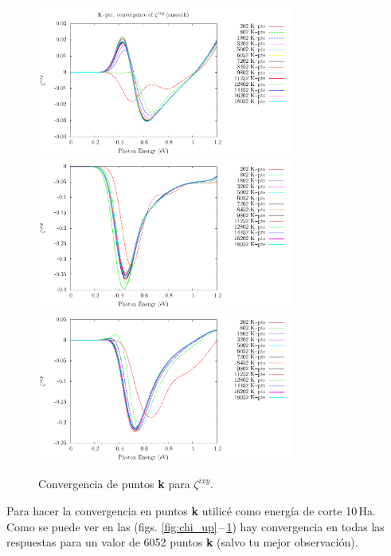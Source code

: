 \documentclass[11pt]{article}
\begin{document}
\begin{figure}
	\begin{center}
		\includegraphics[width=0.75\textwidth]{./figures/up/res41_zeta_1_sm.pdf}\\
		\includegraphics[width=0.75\textwidth]{./figures/up/res41_zeta_2_sm.pdf}\\
		\includegraphics[width=0.75\textwidth]{./figures/up/res41_zeta_3_sm.pdf}
	\end{center}
	\caption{Convergencia de puntos \textbf{k} para $\zeta^{ixy}$.}
	\label{fig:zeta_up}
\end{figure}

\newpage

Para hacer la convergencia en puntos \textbf{k} utilic\'e como energ\'ia de corte 10\,Ha. Como se puede ver en las (figs. \ref{fig:chi_up}\,--\,\ref{fig:zeta_up}) hay convergencia en todas las respuestas para un valor de 6052 puntos \textbf{k} (salvo tu mejor observaci\'on).
\end{document}
